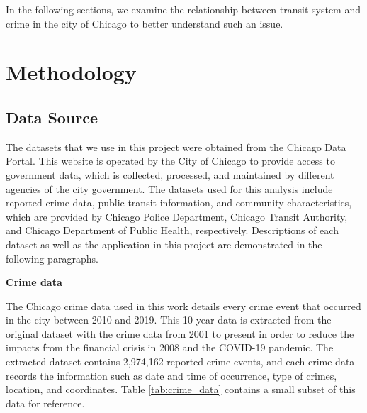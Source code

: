 \documentclass[a4paper, 11pt]{article}
\begin{document}

In the following sections, we examine the relationship between transit system and crime in the city of Chicago to better understand such an issue.


\section{Methodology} \label{sec:methodology}

\subsection{Data Source}

The datasets that we use in this project were obtained from the Chicago Data Portal. This website is operated by the City of Chicago to provide access to government data, which is collected, processed, and maintained by different agencies of the city government. The datasets used for this analysis include reported crime data, public transit information, and community characteristics, which are provided by Chicago Police Department, Chicago Transit Authority, and Chicago Department of Public Health, respectively. Descriptions of each dataset as well as the application in this project are demonstrated in the following paragraphs. 

\textbf{Crime data} 

The Chicago crime data used in this work details every crime event that occurred in the city between 2010 and 2019. This 10-year data is extracted from the original dataset with the crime data from 2001 to present in order to reduce the impacts from the financial crisis in 2008 and the COVID-19 pandemic. The extracted dataset contains 2,974,162 reported crime events, and each crime data records the information such as date and time of occurrence, type of crimes, location, and coordinates. Table \ref{tab:crime_data} contains a small subset of this data for reference. 
\end{document}
